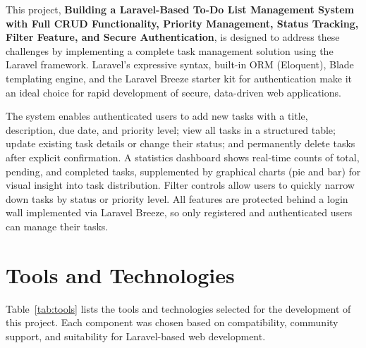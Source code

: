 \documentclass[12pt,a4paper]{report}
\begin{document}
\begin{titlepage}
This project, \textbf{Building a Laravel-Based To-Do List Management System with
Full CRUD Functionality, Priority Management, Status Tracking, Filter Feature, and
Secure Authentication}, is designed to address these challenges by implementing a
complete task management solution using the Laravel framework. Laravel's expressive
syntax, built-in ORM (Eloquent), Blade templating engine, and the Laravel Breeze
starter kit for authentication make it an ideal choice for rapid development of
secure, data-driven web applications.

The system enables authenticated users to add new tasks with a title, description,
due date, and priority level; view all tasks in a structured table; update existing
task details or change their status; and permanently delete tasks after explicit
confirmation. A statistics dashboard shows real-time counts of total, pending, and
completed tasks, supplemented by graphical charts (pie and bar) for visual insight
into task distribution. Filter controls allow users to quickly narrow down tasks by
status or priority level. All features are protected behind a login wall implemented
via Laravel Breeze, so only registered and authenticated users can manage their tasks.

\section{Tools and Technologies}

Table~\ref{tab:tools} lists the tools and technologies selected for the development
of this project. Each component was chosen based on compatibility, community support,
and suitability for Laravel-based web development.


\end{titlepage}
\end{document}
